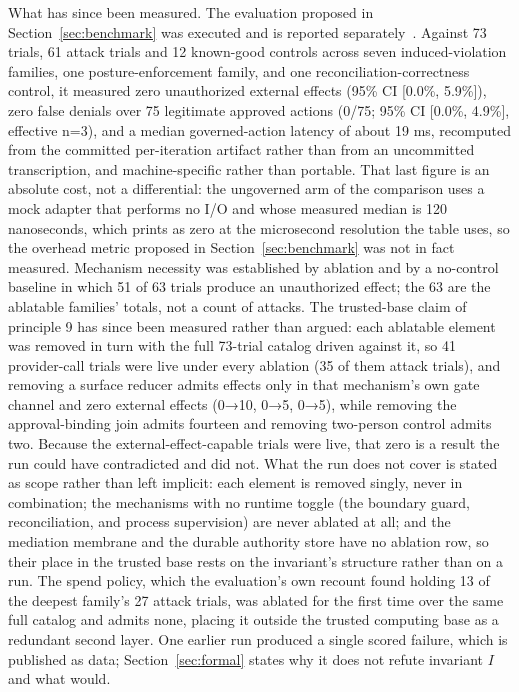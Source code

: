 \documentclass[11pt,letterpaper]{article}
\begin{document}
What has since been measured. The evaluation proposed in Section~\ref{sec:benchmark} was executed and is reported separately~\cite{croft2026eval}. Against 73 trials, 61 attack trials and 12 known-good controls across seven induced-violation families, one posture-enforcement family, and one reconciliation-correctness control, it measured zero unauthorized external effects (95\% CI {[}0.0\%, 5.9\%{]}), zero false denials over 75 legitimate approved actions (0/75; 95\% CI {[}0.0\%, 4.9\%{]}, effective n=3), and a median governed-action latency of about 19 ms, recomputed from the committed per-iteration artifact rather than from an uncommitted transcription, and machine-specific rather than portable. That last figure is an absolute cost, not a differential: the ungoverned arm of the comparison uses a mock adapter that performs no I/O and whose measured median is 120 nanoseconds, which prints as zero at the microsecond resolution the table uses, so the overhead metric proposed in Section~\ref{sec:benchmark} was not in fact measured. Mechanism necessity was established by ablation and by a no-control baseline in which 51 of 63 trials produce an unauthorized effect; the 63 are the ablatable families' totals, not a count of attacks. The trusted-base claim of principle 9 has since been measured rather than argued: each ablatable element was removed in turn with the full 73-trial catalog driven against it, so 41 provider-call trials were live under every ablation (35 of them attack trials), and removing a surface reducer admits effects only in that mechanism's own gate channel and zero external effects (0→10, 0→5, 0→5), while removing the approval-binding join admits fourteen and removing two-person control admits two. Because the external-effect-capable trials were live, that zero is a result the run could have contradicted and did not. What the run does not cover is stated as scope rather than left implicit: each element is removed singly, never in combination; the mechanisms with no runtime toggle (the boundary guard, reconciliation, and process supervision) are never ablated at all; and the mediation membrane and the durable authority store have no ablation row, so their place in the trusted base rests on the invariant's structure rather than on a run. The spend policy, which the evaluation's own recount found holding 13 of the deepest family's 27 attack trials, was ablated for the first time over the same full catalog and admits none, placing it outside the trusted computing base as a redundant second layer. One earlier run produced a single scored failure, which is published as data; Section~\ref{sec:formal} states why it does not refute invariant $I$ and what would.
\end{document}
